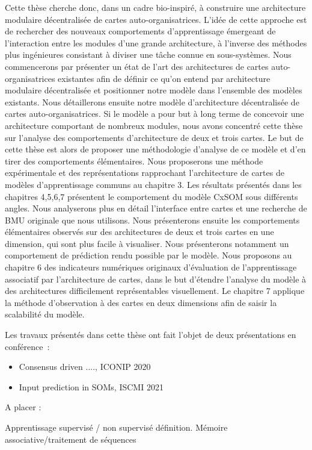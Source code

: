 Cette thèse cherche donc, dans un cadre bio-inspiré, à construire une architecture modulaire décentralisée de cartes auto-organisatrices. L'idée de cette approche est de rechercher des nouveaux comportements d'apprentissage émergeant de l'interaction entre les modules d'une grande architecture, à l'inverse des méthodes plus ingénieures consistant à diviser une tâche connue en sous-systèmes.
Nous commencerons par présenter un état de l'art des architectures de cartes auto-organisatrices existantes afin de définir ce qu'on entend par architecture modulaire décentralisée et positionner notre modèle dans l'ensemble des modèles existants.
Nous détaillerons ensuite notre modèle d'architecture décentralisée de cartes auto-organisatrices.
Si le modèle a pour but à long terme de concevoir une architecture comportant de nombreux modules, nous avons concentré cette thèse sur l'analyse des comportements d'architecture de deux et trois cartes.
Le but de cette thèse est alors de proposer une méthodologie d'analyse de ce modèle et d'en tirer des comportements élémentaires.
Nous proposerons une méthode expérimentale et des représentations rapprochant l'architecture de cartes de modèles d'apprentissage communs au chapitre 3.
Les résultats présentés dans les chapitres 4,5,6,7 présentent le comportement du modèle CxSOM sous différents angles.
Nous analyserons plus en détail l'interface entre cartes et une recherche de BMU originale que nous utilisons.
Nous présenterons ensuite les comportements élémentaires observés sur des architectures de deux et trois cartes en une dimension, qui sont plus facile à visualiser. Nous présenterons notamment un comportement de prédiction rendu possible par le modèle.
Nous proposons au chapitre 6 des indicateurs numériques originaux d'évaluation de l'apprentissage associatif par l'architecture de cartes, dans le but d'étendre l'analyse du modèle à des architectures difficilement représentables visuellement.
Le chapitre 7 applique la méthode d'observation à des cartes en deux dimensions afin de saisir la scalabilité du modèle.

Les travaux présentés dans cette thèse ont fait l'objet de deux présentations en conférence~:
\begin{itemize}
    \item Consensus driven ...., ICONIP 2020
    \item Input prediction in SOMs, ISCMI 2021
\end{itemize}

A placer : 

Apprentissage supervisé / non supervisé définition.
Mémoire associative/traitement de séquences 


